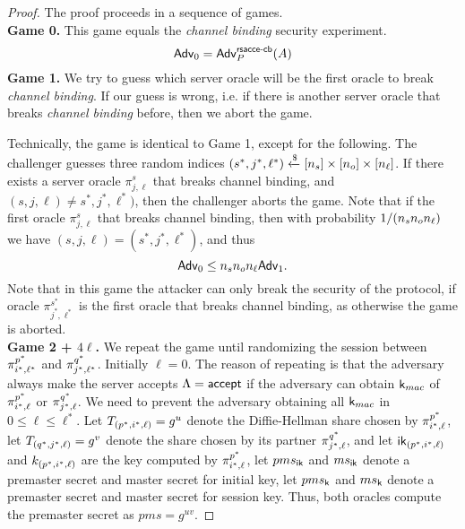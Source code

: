 \begin{proof}
 The proof proceeds in a sequence of games. \vspace{10pt}\\
 \textbf{Game 0.} This game equals the \textit{channel binding} security experiment.
 \begin{equation}
  \mathsf{Adv}_0 = \mathsf{Adv}^{\mathsf{rsacce\textsc{-} cb}}_{P}(A)
 \end{equation}%
%
%
 \textbf{Game 1.} We try to guess which server oracle will be the first oracle to break \textit{channel binding}. If our guess is wrong, i.e. if there is another server oracle that breaks \textit{channel binding} before, then we abort the game.

 Technically, the game is identical to Game 1, except for the following. The challenger guesses three random indices $(s^{\ast}, j^{\ast}, \ell^{\ast}) \xleftarrow{\$} [n_s] \times [n_o] \times [n_{\ell}]$. If there exists a server oracle $\pi^s_{j,\ell}$ that breaks channel binding, and $(s, j, \ell) \neq s^{\ast}, j^{\ast}, \ell^{\ast})$, then the challenger aborts the game. Note that if the first oracle $\pi^s_{j,\ell}$ that breaks channel binding, then with probability $1/(n_s n_o n_{\ell})$ we have $(s,j,\ell) = (s^{\ast}, j^{\ast}, \ell^{\ast})$, and thus
 \begin{equation}
  \mathsf{Adv}_0 \leq n_s n_o n_{\ell} \mathsf{Adv}_1.
 \end{equation}%
 Note that in this game the attacker can only break the security of the protocol, if oracle $\pi^{s^{\ast}}_{j^{\ast},\ell^{\ast}}$ is the first oracle that breaks channel binding, as otherwise the game is aborted.
\vspace{10pt}\\%
%
%
 \textbf{Game 2 + $4\ell$.} We repeat the game until randomizing the session between $\pi^{p^{\ast}}_{i^{\ast},\ell^{\ast}}$ and $\pi^{q^{\ast}}_{j^{\ast},\ell^{\ast}}$. Initially $\ell = 0$. The reason of repeating is that the adversary always make the server accepts $\Lambda = \mathsf{accept}$ if the adversary can obtain $\mathsf{k}_{mac}$ of $\pi^{p^{\ast}}_{i^{\ast},\ell}$ or $\pi^{q^{\ast}}_{j^{\ast},\ell}$. We need to prevent the adversary obtaining all $\mathsf{k}_{mac}$ in $ 0 \leq \ell \leq \ell^{\ast}$.
 Let $T_{(p^{\ast}, i^{\ast}, \ell)} = g^u$ denote the Diffie-Hellman share chosen by $\pi^{p^{\ast}}_{i^{\ast},\ell}$, let $T_{(q^{\ast}, j^{\ast}, \ell)} = g^v$ denote the share chosen by its partner $\pi^{q^{\ast}}_{j^{\ast},\ell}$, and let $\mathsf{ik}_{(p^{\ast}, i^{\ast}, \ell)}$ and $k_{(p^{\ast}, i^{\ast}, \ell)}$ are the key computed by $\pi^{p^{\ast}}_{i^{\ast},\ell}$, let $pms_{\mathsf{ik}}$ and $ms_{\mathsf{ik}}$ denote a premaster secret and master secret for initial key, let $pms_{\mathsf{k}}$ and $ms_{\mathsf{k}}$ denote a premaster secret and master secret for session key. Thus, both oracles compute the premaster secret as $pms = g^{uv}$.


\end{proof}
